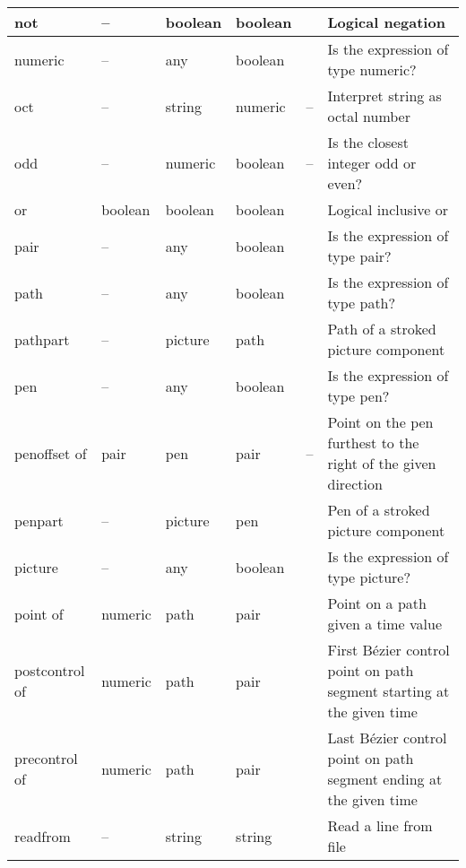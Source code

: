 \begin{longtable}{|>{\raggedright{}\ttfamily}p{.793in}*{3}{|>{\raggedright}p{.715in}}|>{\raggedleft}p{1.5em}|>{\raggedright\arraybackslash}X|}
not&  --&  boolean&  boolean&  \pageref{Dnot}&  Logical negation\\\hline
numeric&  --&  any&  boolean&  \pageref{Dnumop}&  Is the expression of type numeric?\\\hline
oct&  --&  string&  numeric&  --&  Interpret string as octal number\\\hline
odd&  --&  numeric&  boolean&  --&  Is the closest integer odd or even?\\\hline
or&  boolean&  boolean&  boolean&  \pageref{Dor}&  Logical inclusive or\\\hline
pair&  --&  any&  boolean&  \pageref{Dpairop}&  Is the expression of type pair?\\\hline
path&  --&  any&  boolean&  \pageref{Dpathop}&  Is the expression of type path?\\\hline
pathpart&  --&  picture&  path&  \pageref{Dpathpart}&  Path of a stroked picture component\\\hline
pen&  --&  any&  boolean&  \pageref{Dpenop}&  Is the expression of type pen?\\\hline
penoffset of&  pair&  pen&  pair&  --&  Point on the pen furthest to the right of the given direction\\\hline
penpart&  --&  picture&  pen&  \pageref{Dpenpart}&  Pen of a stroked picture component\\\hline
picture&  --&  any&  boolean&  \pageref{Dpictop}&  Is the expression of type picture?\\\hline
point of&  numeric&  path&  pair&  \pageref{Dpntof}&  Point on a path given a time value\\\hline
postcontrol of&  numeric&  path&  pair&  \pageref{Dprepostctrl}&  First B\'ezier control point on path segment starting at the given time\\\hline
precontrol of&  numeric&  path&  pair&  \pageref{Dprepostctrl}&  Last B\'ezier control point on path segment ending at the given time\\\hline
readfrom&  --&  string&  string&  \pageref{Dreadfrom}&  Read a line from file\\\hline

\end{longtable}
